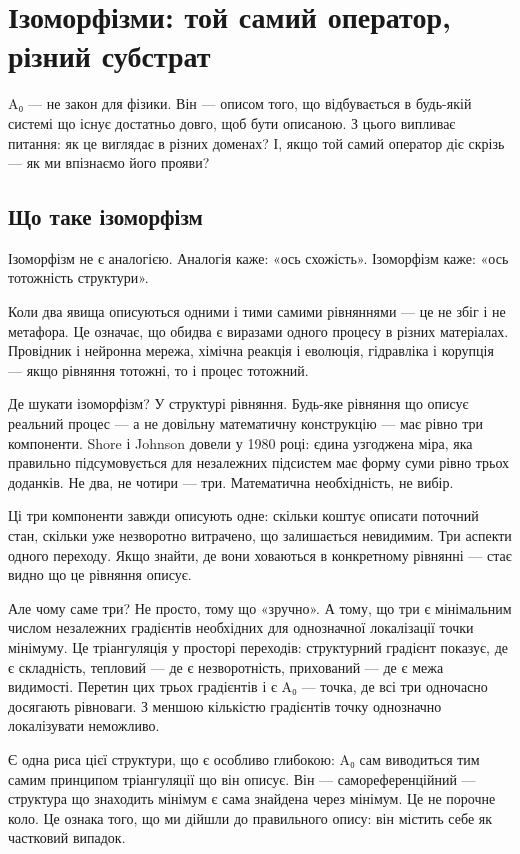 \documentclass[12pt, a4paper, openany]{book}
\begin{document}
\chapter{Ізоморфізми: той самий оператор, різний субстрат}

A₀ — не закон для фізики. Він — описом того, що відбувається в будь-якій системі що існує достатньо довго, щоб бути описаною. З цього випливає питання: як це виглядає в різних доменах? І, якщо той самий оператор діє скрізь --- як ми впізнаємо його прояви?

\section{Що таке ізоморфізм}

Ізоморфізм не є аналогією. Аналогія каже: «ось схожість». Ізоморфізм каже: «ось тотожність структури».

Коли два явища описуються одними і тими самими рівняннями --- це не збіг і не метафора. Це означає, що обидва є виразами одного процесу в різних матеріалах. Провідник і нейронна мережа, хімічна реакція і еволюція, гідравліка і корупція --- якщо рівняння тотожні, то і процес тотожний.

Де шукати ізоморфізм? У структурі рівняння. Будь-яке рівняння що описує реальний процес --- а не довільну математичну конструкцію --- має рівно три компоненти. Shore і Johnson довели у 1980 році: єдина узгоджена міра, яка правильно підсумовується для незалежних підсистем має форму суми рівно трьох доданків. Не два, не чотири --- три. Математична необхідність, не вибір.

Ці три компоненти завжди описують одне: скільки коштує описати поточний стан, скільки уже незворотно витрачено, що залишається невидимим. Три аспекти одного переходу. Якщо знайти, де вони ховаються в конкретному рівнянні --- стає видно що це рівняння описує.

Але чому саме три? Не просто, тому що «зручно». А тому, що три є мінімальним числом незалежних градієнтів необхідних для однозначної локалізації точки мінімуму. Це тріангуляція у просторі переходів: структурний градієнт показує, де є складність, тепловий --- де є незворотність, прихований --- де є межа видимості. Перетин цих трьох градієнтів і є A₀ --- точка, де всі три одночасно досягають рівноваги. З меншою кількістю градієнтів точку однозначно локалізувати неможливо.

Є одна риса цієї структури, що є особливо глибокою: A₀ сам виводиться тим самим принципом тріангуляції що він описує. Він — самореференційний — структура що знаходить мінімум є сама знайдена через мінімум. Це не порочне коло. Це ознака того, що ми дійшли до правильного опису: він містить себе як частковий випадок.
\end{document}
